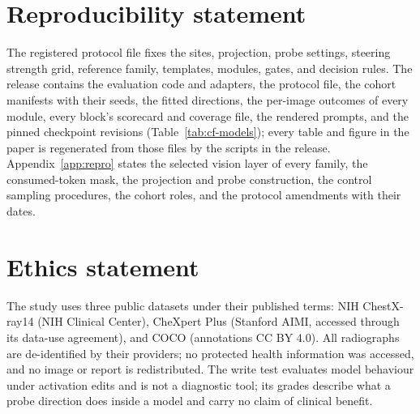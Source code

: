 \section*{Reproducibility statement}
The registered protocol file fixes the sites, projection, probe settings, steering strength grid, reference family, templates, modules, gates, and decision rules. The release contains the evaluation code and adapters, the protocol file, the cohort manifests with their seeds, the fitted directions, the per-image outcomes of every module, every block's scorecard and coverage file, the rendered prompts, and the pinned checkpoint revisions (Table~\ref{tab:cf-models}); every table and figure in the paper is regenerated from those files by the scripts in the release. Appendix~\ref{app:repro} states the selected vision layer of every family, the consumed-token mask, the projection and probe construction, the control sampling procedures, the cohort roles, and the protocol amendments with their dates.

\section*{Ethics statement}
The study uses three public datasets under their published terms: NIH ChestX-ray14 (NIH Clinical Center), CheXpert Plus (Stanford AIMI, accessed through its data-use agreement), and COCO (annotations CC BY 4.0). All radiographs are de-identified by their providers; no protected health information was accessed, and no image or report is redistributed. The write test evaluates model behaviour under activation edits and is not a diagnostic tool; its grades describe what a probe direction does inside a model and carry no claim of clinical benefit.
